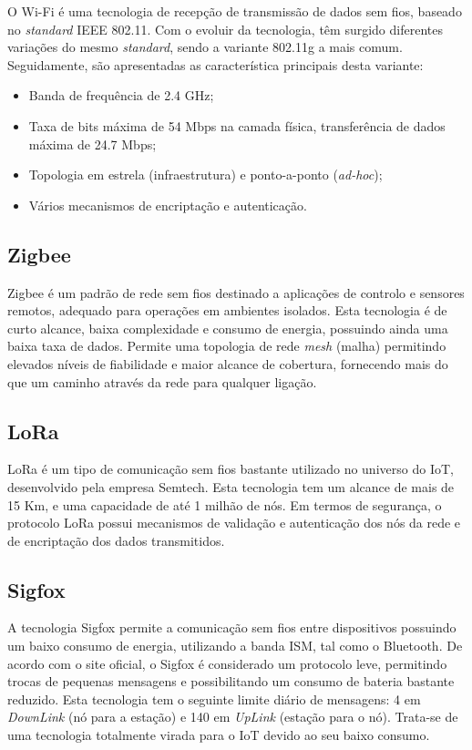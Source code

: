 O Wi-Fi é uma tecnologia de recepção de transmissão de dados sem fios, baseado no \textit{standard} IEEE 802.11. Com o evoluir da tecnologia, têm surgido diferentes variações do mesmo \textit{standard}, sendo a variante 802.11g a mais comum. Seguidamente, são apresentadas as característica principais desta variante\cite{Paper2005}\cite{urlwifi}:

\begin{itemize}
	\item Banda de frequência de 2.4 GHz;
	\item Taxa de bits máxima de 54 Mbps na camada física, transferência de dados máxima de 24.7 Mbps;
	\item Topologia em estrela (infraestrutura) e ponto-a-ponto (\textit{ad-hoc});
	\item Vários mecanismos de encriptação e autenticação.
\end{itemize}

\subsection{Zigbee}


Zigbee é um padrão de rede sem fios destinado a aplicações de controlo e sensores remotos, adequado para operações em ambientes isolados. Esta tecnologia é de curto alcance, baixa complexidade e consumo de energia, possuindo ainda uma baixa taxa de dados. Permite uma topologia de rede \textit{mesh} (malha) permitindo elevados níveis de fiabilidade e maior alcance de cobertura, fornecendo mais do que um caminho através da rede para qualquer ligação\cite{Rahman2015}. 

\subsection{LoRa}

\ac{LoRa} é um tipo de comunicação sem fios bastante utilizado no universo do \ac{IoT}, desenvolvido pela empresa Semtech. Esta tecnologia tem um alcance de mais de 15 Km, e uma capacidade de até 1 milhão de nós. Em termos de segurança, o protocolo LoRa possui mecanismos de validação e autenticação dos nós da rede e de encriptação dos dados transmitidos\cite{LinkLabs2015}\cite{Semtech2017}. 

\subsection{Sigfox}

A tecnologia Sigfox permite a comunicação sem fios entre dispositivos possuindo um baixo consumo de energia, utilizando a banda \ac{ISM}, tal como o Bluetooth. De acordo com o site oficial, o Sigfox é considerado um protocolo leve, permitindo trocas de pequenas mensagens e possibilitando um consumo de bateria bastante reduzido. Esta tecnologia tem o seguinte limite diário de mensagens: 4 em \textit{DownLink} (nó para a estação) e 140 em \textit{UpLink} (estação para o nó)\cite{sigfoxsite}. Trata-se de uma tecnologia totalmente virada para o \ac{IoT} devido ao seu baixo consumo. 

